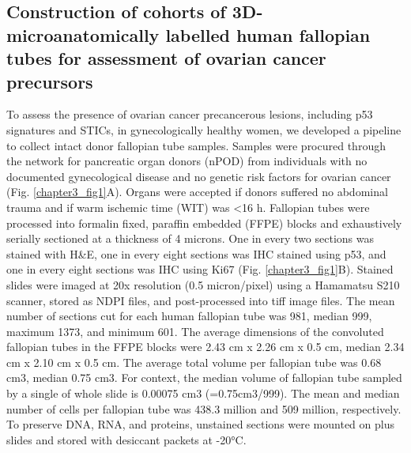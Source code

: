 \begin{refsection}
    \subsection{Construction of cohorts of 3D-microanatomically labelled human fallopian tubes for assessment of ovarian cancer precursors }
    To assess the presence of ovarian cancer precancerous lesions, including p53 signatures and STICs, in gynecologically healthy women, we developed a pipeline to collect intact donor fallopian tube samples. Samples were procured through the network for pancreatic organ donors (nPOD) from individuals with no documented gynecological disease and no genetic risk factors for ovarian cancer (Fig. \ref{chapter3_fig1}A). Organs were accepted if donors suffered no abdominal trauma and if warm ischemic time (WIT) was <16 h.
    Fallopian tubes were processed into formalin fixed, paraffin embedded (FFPE) blocks and exhaustively serially sectioned at a thickness of 4 microns. One in every two sections was stained with H\&E, one in every eight sections was IHC stained using p53, and one in every eight sections was IHC using Ki67 (Fig. \ref{chapter3_fig1}B). Stained slides were imaged at 20x resolution (0.5 micron/pixel) using a Hamamatsu S210 scanner, stored as NDPI files, and post-processed into tiff image files. The mean number of sections cut for each human fallopian tube was 981, median 999, maximum 1373, and minimum 601. The average dimensions of the convoluted fallopian tubes in the FFPE blocks were 2.43 cm x 2.26 cm x 0.5 cm, median 2.34 cm x 2.10 cm x 0.5 cm. The average total volume per fallopian tube was 0.68 cm3, median 0.75 cm3. For context, the median volume of fallopian tube sampled by a single of whole slide is 0.00075 cm3 (=0.75cm3/999). The mean and median number of cells per fallopian tube was 438.3 million and 509 million, respectively. To preserve DNA, RNA, and proteins, unstained sections were mounted on plus slides and stored with desiccant packets at -20°C. 

\end{refsection}
